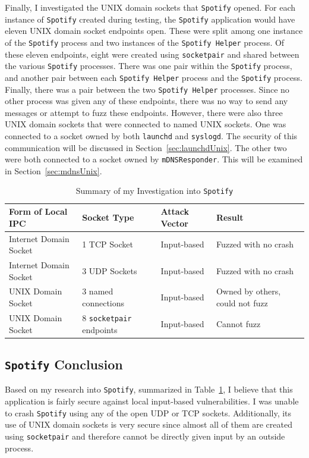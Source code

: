 Finally, I investigated the UNIX domain sockets that \texttt{Spotify} opened.  For each instance of \texttt{Spotify} created during testing, the \texttt{Spotify} application would have eleven UNIX domain socket endpoints open.  These were split among one instance of the \texttt{Spotify} process and two instances of the \texttt{Spotify Helper} process.  Of these eleven endpoints, eight were created using \texttt{socketpair} and shared between the various \texttt{Spotify} processes.  There was one pair within the \texttt{Spotify} process, and another pair between each \texttt{Spotify Helper} process and the \texttt{Spotify} process.  Finally, there was a pair between the two \texttt{Spotify Helper} processes.  Since no other process was given any of these endpoints, there was no way to send any messages or attempt to fuzz these endpoints.  However, there were also three UNIX domain sockets that were connected to named UNIX sockets.  One was connected to a socket owned by both \texttt{launchd} and \texttt{syslogd}.  The security of this communication will be discussed in Section~\ref{sec:launchdUnix}.  The other two were both connected to a socket owned by \texttt{mDNSResponder}.  This will be examined in Section~\ref{sec:mdnsUnix}.

\begin{table}
\centering
\begin{scriptsize}
\begin{tabular}{ l | l | l | l }
\textbf{Form of Local IPC} & \textbf{Socket Type} & \textbf{Attack Vector} & \textbf{Result} \\ \hline
Internet Domain Socket & 1 TCP Socket & Input-based & Fuzzed with no crash \\ \hline
Internet Domain Socket & 3 UDP Sockets & Input-based & Fuzzed with no crash \\ \hline
UNIX Domain Socket & 3 named connections & Input-based & Owned by others, could not fuzz \\ \hline
UNIX Domain Socket & 8 \texttt{socketpair} endpoints & Input-based & Cannot fuzz \\ \hline
\end{tabular}
\caption{Summary of my Investigation into \texttt{Spotify}}
\label{tab:spotifyData}
\end{scriptsize}
\end{table} 

\subsection{\texttt{Spotify} Conclusion}
\label{sec:spotifyConclusion}
Based on my research into \texttt{Spotify}, summarized in Table~\ref{tab:spotifyData}, I believe that this application is fairly secure against local input-based vulnerabilities.  I was unable to crash \texttt{Spotify} using any of the open UDP or TCP sockets.  Additionally, its use of UNIX domain sockets is very secure since almost all of them are created using \texttt{socketpair} and therefore cannot be directly given input by an outside process.

